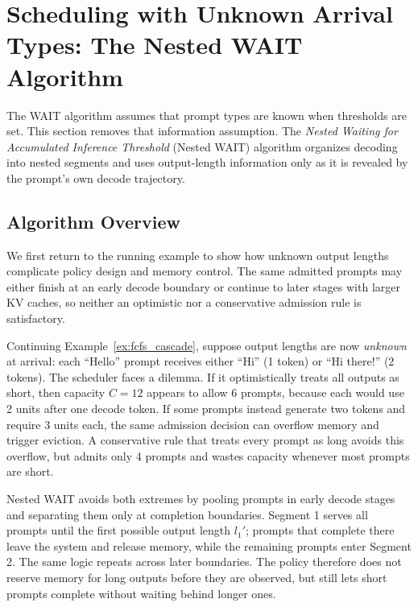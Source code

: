 \section{Scheduling with Unknown Arrival Types: The Nested WAIT Algorithm}
\label{sec:nested_wait}

The WAIT algorithm assumes that prompt types are known when thresholds are set. This section removes that information assumption. The \textit{Nested Waiting for Accumulated Inference Threshold} (Nested WAIT) algorithm organizes decoding into nested segments and uses output-length information only as it is revealed by the prompt's own decode trajectory.

\subsection{Algorithm Overview}

We first return to the running example to show how unknown output lengths complicate policy design and memory control. The same admitted prompts may either finish at an early decode boundary or continue to later stages with larger KV caches, so neither an optimistic nor a conservative admission rule is satisfactory.

\begin{example}
\label{ex:unknown_output}
Continuing Example~\ref{ex:fcfs_cascade}, suppose output lengths are now \emph{unknown} at arrival: each ``Hello'' prompt receives either ``Hi'' (1 token) or ``Hi there!'' (2 tokens). The scheduler faces a dilemma. If it optimistically treats all outputs as short, then capacity \(C=12\) appears to allow 6 prompts, because each would use 2 units after one decode token. If some prompts instead generate two tokens and require 3 units each, the same admission decision can overflow memory and trigger eviction. A conservative rule that treats every prompt as long avoids this overflow, but admits only 4 prompts and wastes capacity whenever most prompts are short.
\end{example}

Nested WAIT avoids both extremes by pooling prompts in early decode stages and separating them only at completion boundaries. Segment 1 serves all prompts until the first possible output length \(l_1'\); prompts that complete there leave the system and release memory, while the remaining prompts enter Segment 2. The same logic repeats across later boundaries. The policy therefore does not reserve memory for long outputs before they are observed, but still lets short prompts complete without waiting behind longer ones.

